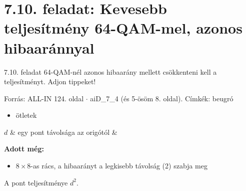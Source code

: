 \begin{eredmeny}

\begin{center}\end{center}
\end{eredmeny}


\section{\texorpdfstring{7.10. feladat: Kevesebb teljesítmény 64-QAM-mel, azonos hibaaránnyal}{7.10. feladat: Kevesebb teljesítmény 64-QAM-mel, azonos hibaaránnyal}}\label{ai7_10}
\setcounter{lepes}{0}
\begin{feladat}{7.10. feladat}
64-QAM-nél azonos hibaarány mellett csökkenteni kell a teljesítményt. Adjon tippeket!

{\footnotesize\sffamily Forrás: ALL-IN 124. oldal $\cdot$ aiD\_7\_4 (és 5-ösöm 8. oldal). Címkék: beugró}
\end{feladat}
\begin{keresunk}
\begin{itemize}
\item ötletek
\end{itemize}
\end{keresunk}
\begin{jeloles}
\begin{jeltabla}
$d$ & egy pont távolsága az origótól & \\
\end{jeltabla}
\par\smallskip\textbf{Adott még:}
\begin{itemize}
\item $8\times8$-as rács, a hibaarányt a legkisebb távolság (2) szabja meg
\end{itemize}
\end{jeloles}

A pont teljesítménye $d^2$.

\begin{center}\end{center}

